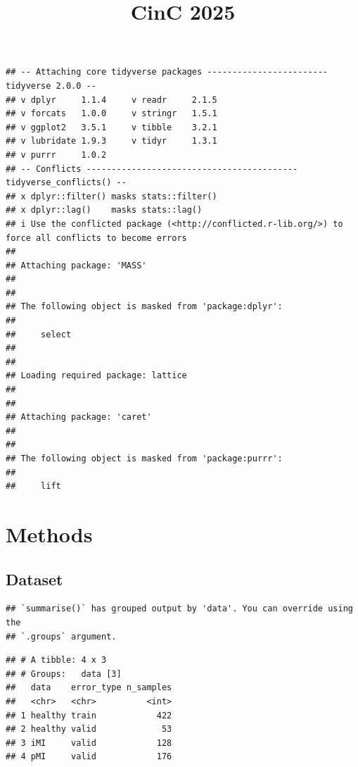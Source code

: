 \documentclass[
]{article}
\title{CinC 2025}
\author{}
\date{\vspace{-2.5em}}
\begin{document}
\maketitle

\begin{verbatim}
## -- Attaching core tidyverse packages ------------------------ tidyverse 2.0.0 --
## v dplyr     1.1.4     v readr     2.1.5
## v forcats   1.0.0     v stringr   1.5.1
## v ggplot2   3.5.1     v tibble    3.2.1
## v lubridate 1.9.3     v tidyr     1.3.1
## v purrr     1.0.2     
## -- Conflicts ------------------------------------------ tidyverse_conflicts() --
## x dplyr::filter() masks stats::filter()
## x dplyr::lag()    masks stats::lag()
## i Use the conflicted package (<http://conflicted.r-lib.org/>) to force all conflicts to become errors
## 
## Attaching package: 'MASS'
## 
## 
## The following object is masked from 'package:dplyr':
## 
##     select
## 
## 
## Loading required package: lattice
## 
## 
## Attaching package: 'caret'
## 
## 
## The following object is masked from 'package:purrr':
## 
##     lift
\end{verbatim}

\section{Methods}\label{methods}

\subsection{Dataset}\label{dataset}

\begin{verbatim}
## `summarise()` has grouped output by 'data'. You can override using the
## `.groups` argument.
\end{verbatim}

\begin{verbatim}
## # A tibble: 4 x 3
## # Groups:   data [3]
##   data    error_type n_samples
##   <chr>   <chr>          <int>
## 1 healthy train            422
## 2 healthy valid             53
## 3 iMI     valid            128
## 4 pMI     valid            176
\end{verbatim}
\end{document}
